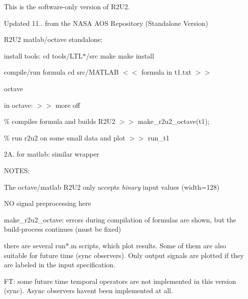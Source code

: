 This is the software-\/only version of R2\+U2.

Updated 11.. from the N\+A\+SA A\+OS Repository (Standalone Version)

R2\+U2 matlab/octave standalone\+:


\begin{DoxyEnumerate}
\item install tools\+: cd tools/\+L\+T\+L$\ast$/src make make install
\item compile/run formula cd src/\+M\+A\+T\+L\+AB $<$$<$ formula in t1.\+txt $>$$>$

octave

in octave\+: $>$$>$ more off

\% compiles formula and builds R2\+U2 $>$$>$ make\+\_\+r2u2\+\_\+octave(\textquotesingle{}t1\textquotesingle{});

\% run r2u2 on some small data and plot $>$$>$ run\+\_\+t1
\end{DoxyEnumerate}

2A. for matlab\+: similar wrapper


\begin{DoxyEnumerate}
\item N\+O\+T\+ES\+:
\end{DoxyEnumerate}
\begin{DoxyItemize}
\item The octave/matlab R2\+U2 only accepts {\itshape binary} input values (width=128)
\item NO signal preprocessing here
\item make\+\_\+r2u2\+\_\+octave\+: errors during compilation of formulas are shown, but the build-\/process continues (must be fixed)
\item there are several run$\ast$.m scripts, which plot results. Some of them are also suitable for future time (sync observers). Only output signals are plotted if they are labeled in the input specification.
\item FT\+: some future time temporal operators are not implemented in this version (sync). Async observers haven\textquotesingle{}t been implemented at all. 
\end{DoxyItemize}